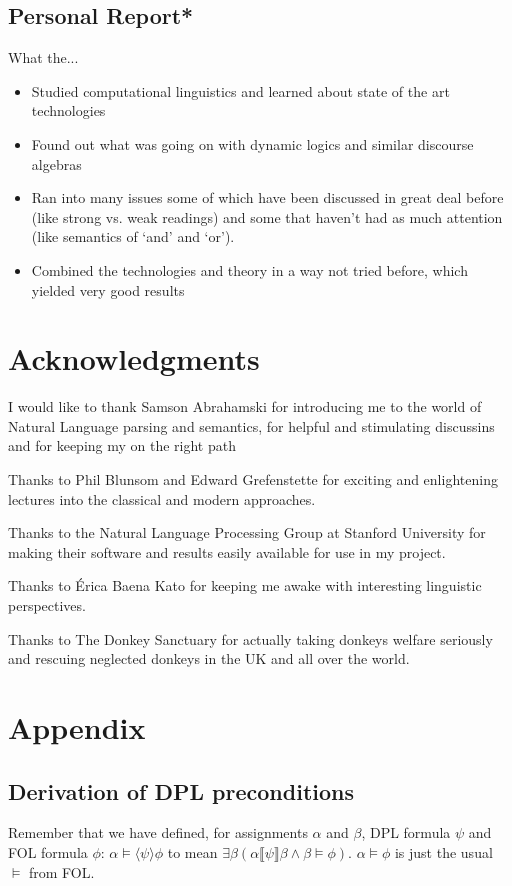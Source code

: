 \documentclass[12pt]{article}
\let\stdsection\section
\renewcommand\section{\newpage\stdsection}
\begin{document}
\subsection{Personal Report*}

What the...

\begin{itemize}
\item Studied computational linguistics and learned about state of the art technologies
\item Found out what was going on with dynamic logics and 
similar discourse algebras
\item Ran into many issues some of which have been discussed in great deal before (like strong vs. weak readings) and some that haven't had as much attention (like semantics of `and' and `or').
\item Combined the technologies and theory in a way not tried before, which yielded very good results
\end{itemize}

\section{Acknowledgments}
I would like to thank Samson Abrahamski for introducing me to the world of Natural Language parsing and semantics, for helpful and stimulating discussins and for keeping my on the right path

Thanks to Phil Blunsom and Edward Grefenstette for exciting and enlightening lectures into the classical and modern approaches.

Thanks to the Natural Language Processing Group at Stanford University for making their software and results easily available for use in my project\cite{klein2003accurate}.

Thanks to Érica Baena Kato for keeping me awake with interesting linguistic perspectives.

Thanks to The Donkey Sanctuary\cite{donkey2013sanctuary} for actually taking donkeys welfare seriously and rescuing neglected donkeys in the UK and all over the world.

\newpage
\section{Appendix}
\subsection{Derivation of DPL preconditions}
Remember that we have defined, for assignments $\alpha$ and $\beta$, DPL formula $\psi$ and FOL formula $\phi$: $\alpha\models\langle\psi\rangle\phi$ to mean $\exists\beta(\alpha\llbracket\psi\rrbracket\beta\wedge\beta\models\phi)$. $\alpha\models\phi$ is just the usual $\models$ from FOL.
\end{document}
